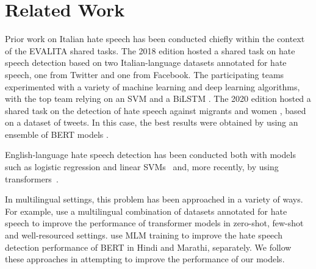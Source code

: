 \documentclass[11pt]{article}
\newcommand{\todoP}[1]{\todo[color=red]{P: #1}}
\begin{document}

\section{Related Work}

Prior work on Italian hate speech has been conducted chiefly within the context of the EVALITA shared tasks. The 2018 edition hosted a shared task on hate speech detection \cite{boscoOverviewEVALITA2018} based on two Italian-language datasets annotated for hate speech, one from Twitter and one from Facebook. The participating teams experimented with a variety of machine learning and deep learning algorithms, with the top team relying on an SVM and a BiLSTM \cite{cimino2018multi}. The 2020 edition hosted a shared task on the detection of hate speech against migrants and women \cite{basileEVALITA2020Overview}, based on a dataset of tweets. In this case, the best results were obtained by using an ensemble of BERT models \cite{mutiUniBOAMIMultiClass2020}.

English-language hate speech detection has been conducted both with models such as logistic regression and linear SVMs~\cite{davidson-2017-automated-hate} and, more recently, by using transformers~\cite{mathew2021hatexplain}.

In multilingual settings, this problem has been approached in a variety of ways. For example,  use a multilingual combination of datasets annotated for hate speech to improve the performance of transformer models in zero-shot, few-shot and well-resourced settings.  use MLM training to improve the hate speech detection performance of BERT in Hindi and Marathi, separately. We follow these approaches in attempting to improve the performance of our models.

\end{document}
